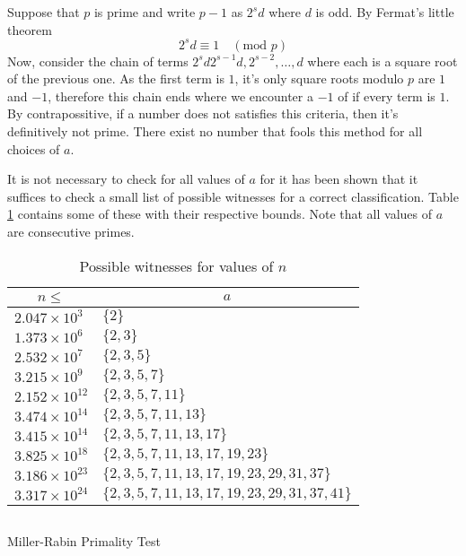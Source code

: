Suppose that $p$ is prime and write $p-1$ as $2^sd$ where $d$ is odd. By
Fermat's little theorem
\begin{equation*}
    2^sd \equiv 1\quad (\text{mod } p)
\end{equation*}
Now, consider the chain of terms $2^sd 2^{s-1}d, 2^{s-2},\dots, d$ where each is
a square root of the previous one. As the first term is $1$, it's only square
roots modulo $p$ are $1$ and $-1$, therefore this chain ends where we encounter
a $-1$ of if every term is $1$. By contrapossitive, if a number does not
satisfies this criteria, then it's definitively not prime. There exist no number
that fools this method for all choices of $a$.

It is not necessary to check for all values of $a$ for it has been shown that it
suffices to check a small list of possible witnesses for a correct classification.
Table \ref{tab:miller:a} contains some of these with their respective bounds.
Note that all values of $a$ are consecutive primes.

\begin{table}[ht]
    \centering
    \begin{tabular}{l|l}
        \multicolumn{1}{c|}{$n \leq$} & \multicolumn{1}{|c}{$a$}\\
        \hline
        $2.047 \times 10^3$    & $\{2\}$\\
        $1.373 \times 10^6$    & $\{2, 3\}$\\
        $2.532 \times 10^7$    & $\{2, 3, 5\}$\\
        $3.215 \times 10^9$    & $\{2, 3, 5, 7\}$\\
        $2.152 \times 10^{12}$ & $\{2, 3, 5, 7, 11\}$\\
        $3.474 \times 10^{14}$ & $\{2, 3, 5, 7, 11, 13\}$\\
        $3.415 \times 10^{14}$ & $\{2, 3, 5, 7, 11, 13, 17\}$\\
        $3.825 \times 10^{18}$ & $\{2, 3, 5, 7, 11, 13, 17, 19, 23\}$\\
        $3.186 \times 10^{23}$ & $\{2, 3, 5, 7, 11, 13, 17, 19, 23, 29, 31, 37\}$\\
        $3.317 \times 10^{24}$ & $\{2, 3, 5, 7, 11, 13, 17, 19, 23, 29, 31, 37, 41\}$
    \end{tabular}
    \caption{Possible witnesses for values of $n$
        \label{tab:miller:a}}
\end{table}

\begin{algorithm}[ht]
    \inputminted[linenos, frame=lines]{python}{./code/algorithms/miller_test.py}
    \caption{Miller-Rabin Primality Test}
\end{algorithm}

